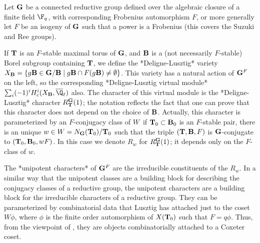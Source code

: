 \def\bB{{\bf B}}
\def\bG{{\bf G}}
\def\bL{{\bf L}}
\def\bP{{\bf P}}
\def\bT{{\bf T}}
\def\bU{{\bf U}}
\def\Sym{{\mathfrak S}}

Let $\bG$ be a connected reductive group defined over the algebraic closure
of a finite field $\F_q$, with corresponding Frobenius automorphism $F$, or
more  generally let  $F$ be  an isogeny  of $\bG$  such that  a power  is a
Frobenius (this covers the Suzuki and Ree groups).

If  $\bT$ is  an $F$-stable  maximal torus  of $\bG$,  and $\bB$  is a (not
necessarily  $F$-stable)  Borel  subgroup  containing  $\bT$, we define the
*Deligne-Lusztig*    variety   $X_\bB=\{   g\bB\in\bG/\bB   \mid   g\bB\cap
F(g\bB)\ne\emptyset\}$. This variety has a natural action of $\bG^F$ on the
left,  so the corresponding *Deligne-Lusztig virtual module* $\sum_i (-1)^i
H^i_c(X_\bB,\overline\Q_\ell)$  also. The character  of this virtual module
is  the *Deligne-Lusztig*  character $R_\bT^\bG(1)$;  the notation reflects
the  fact that  one can  prove that  this character  does not depend on the
choice   of  $\bB$.  Actually,  this   character  is  parameterized  by  an
$F$-conjugacy class of $W$\:\ if $\bT_0\subset\bB_0$ is an $F$-stable pair,
there  is  an  unique  $w\in  W=N_\bG(\bT_0)/\bT_0$  such  that  the triple
$(\bT,\bB,F)$  is $\bG$-conjugate  to $(\bT_0,\bB_0,wF)$.  In this  case we
denote $R_w$ for $R_\bT^\bG(1)$; it depends only on the $F$-class of $w$.

The  *unipotent characters* of $\bG^F$  are the irreducible constituents of
the $R_w$. In a similar way that the unipotent classes are a building block
for  describing the conjugacy  classes of a  reductive group, the unipotent
characters  are  a  building  block  for  the  irreducible  characters of a
reductive  group.  They  can  be  parameterized  by combinatorial data that
Lusztig  has attached just to the coset $W\phi$, where $\phi$ is the finite
order  automorphism  of  $X(\bT_0)$  such  that  $F=q\phi$.  Thus, from the
viewpoint  of  \CHEVIE,  they  are  objects  combinatorially  attached to a
Coxeter coset.

